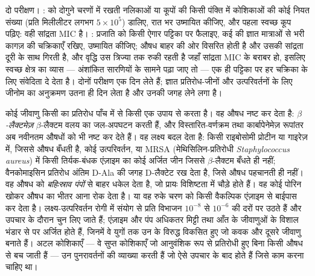 \begin{method}[संवेदिता मापना]\label{met:b3:bacteriology:mic}
दो परीक्षण। \emph{}:  को दोगुने चरणों में रखती
नलिकाओं या कूपों की किसी पंक्ति में कोशिकाओं की कोई नियत संख्या
(प्रति मिलीलीटर लगभग $5\times 10^{5}$) डालिए, रात भर उष्मायित कीजिए, और
पहला स्वच्छ कूप पढ़िए: वही सांद्रता MIC है। \emph{}:
प्रजाति को किसी ऐगार पट्टिका पर फैलाइए, कई  की ज्ञात
मात्राओं से भरी कागज़ की चक्रिकाएँ रखिए, उष्मायित कीजिए; औषध बाहर की ओर
विसरित होती है और उसकी सांद्रता दूरी के साथ गिरती है, और वृद्धि उस
त्रिज्या तक रुकी रहती है जहाँ सांद्रता MIC के बराबर हो, इसलिए स्वच्छ
क्षेत्र का व्यास --- अंशांकित सारणियों के सामने पढ़ा जाए तो --- एक ही
पट्टिका पर हर चक्रिका के लिए संवेदिता दे देता है। दोनों परीक्षण एक दिन
लेते हैं; ज्ञात प्रतिरोध-जीनों और उत्परिवर्तनों के लिए जीनोम का
अनुक्रमण उतना ही दिन लेता है और उनकी जगह लेने लगा है।
\end{method}

\begin{definition}[प्रतिरोध]\label{def:b3:bacteriology:resistance}
कोई जीवाणु किसी  का प्रतिरोध पाँच में से किसी एक उपाय से
करता है। वह औषध नष्ट कर देता है: \emph{$\beta$-लैक्टमेज़}
$\beta$-लैक्टम वलय का जल-अपघटन करती हैं, और विस्तारित-वर्णक्रम तथा
कार्बापेनेमेज़ रूपांतर अब नवीनतम औषधों को भी नष्ट कर देते हैं। वह
लक्ष्य बदल देता है: किसी राइबोसोमी प्रोटीन या गाइरेज़ में, जिससे औषध
बँधती है, कोई उत्परिवर्तन, या MRSA (मेथिसिलिन-प्रतिरोधी
\emph{Staphylococcus aureus}) में किसी तिर्यक-बंधक एंज़ाइम का कोई अर्जित
जीन जिससे $\beta$-लैक्टम बँधते ही नहीं; वैनकोमाइसिन प्रतिरोध अंतिम
D-Ala की जगह D-लैक्टेट रख देता है, जिसे औषध पहचानती ही नहीं।
वह औषध को \emph{बहिःस्राव पंपों} से बाहर धकेल देता है, जो प्रायः
विशिष्टता में चौड़े होते हैं। वह कोई पोरिन खोकर औषध का भीतर आना रोक देता
है। या वह रुके चरण को किसी वैकल्पिक एंज़ाइम से बाईपास कर देता है।
लक्ष्य-उत्परिवर्तन रोगी में संयोग से प्रति विभाजन $10^{-8}$ से $10^{-6}$
की दरों पर उठते हैं और उपचार के दौरान चुन लिए जाते हैं; एंज़ाइम और पंप
अधिकतर मिट्टी तथा आँत के जीवाणुओं के विशाल भंडार से  पर
अर्जित होते हैं, जिनमें वे युगों तक उन  के विरुद्ध विकसित
हुए जो कवक और दूसरे जीवाणु बनाते हैं। अटल कोशिकाएँ --- वे सुप्त
कोशिकाएँ जो आनुवंशिक रूप से प्रतिरोधी हुए बिना किसी औषध से बच जाती हैं
--- उन पुनरावर्तनों की व्याख्या करती हैं जो ऐसे उपचार के बाद होते हैं
जिसे काम करना चाहिए था।
\end{definition}

